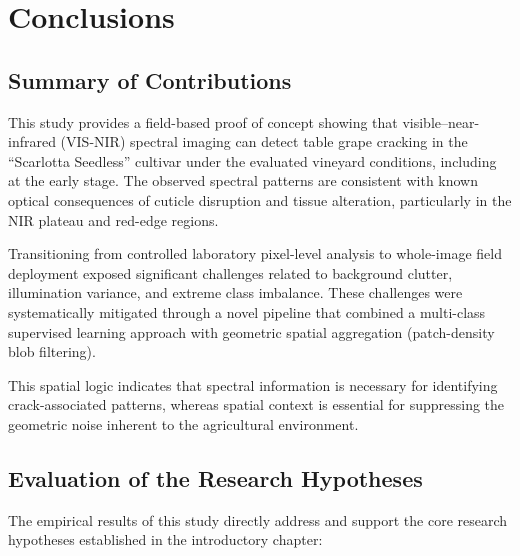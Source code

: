 
\chapter{Conclusions}
\label{chap:conclusions}

\section{Summary of Contributions}
\label{sec:summary_contributions}
\noindent
This study provides a field-based proof of concept showing that visible–near-infrared (VIS-NIR) spectral imaging can detect table grape cracking in the “Scarlotta Seedless” cultivar under the evaluated vineyard conditions, including at the early stage. The observed spectral patterns are consistent with known optical consequences of cuticle disruption and tissue alteration, particularly in the NIR plateau and red-edge regions.

\medskip\noindent
Transitioning from controlled laboratory pixel-level analysis to whole-image field deployment exposed significant challenges related to background clutter, illumination variance, and extreme class imbalance. These challenges were systematically mitigated through a novel pipeline that combined a multi-class supervised learning approach with geometric spatial aggregation (patch-density blob filtering).

\medskip\noindent
This spatial logic indicates that spectral information is necessary for identifying crack-associated patterns, whereas spatial context is essential for suppressing the geometric noise inherent to the agricultural environment.

\newpage
\section{Evaluation of the Research Hypotheses}
\label{sec:revisiting_hypotheses}
\noindent
The empirical results of this study directly address and support the core research hypotheses established in the introductory chapter:

